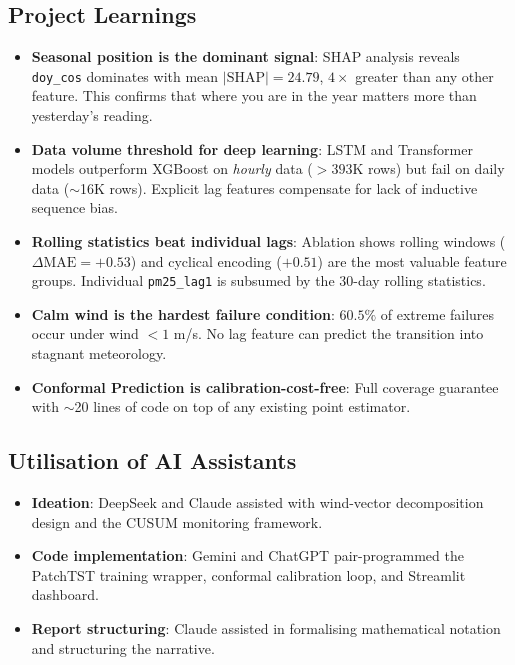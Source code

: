 \documentclass[11pt,a4paper]{article}
\begin{document}
\subsection{Project Learnings}
\begin{itemize}
    \item \textbf{Seasonal position is the dominant signal}: SHAP analysis reveals \texttt{doy\_cos} dominates with mean $|\text{SHAP}|=24.79$, $4\times$ greater than any other feature. This confirms that where you are in the year matters more than yesterday's reading.
    \item \textbf{Data volume threshold for deep learning}: LSTM and Transformer models outperform XGBoost on \emph{hourly} data ($>393$K rows) but fail on daily data ($\sim$16K rows). Explicit lag features compensate for lack of inductive sequence bias.
    \item \textbf{Rolling statistics beat individual lags}: Ablation shows rolling windows ($\Delta\mathrm{MAE}=+0.53$) and cyclical encoding ($+0.51$) are the most valuable feature groups. Individual \texttt{pm25\_lag1} is subsumed by the 30-day rolling statistics.
    \item \textbf{Calm wind is the hardest failure condition}: $60.5\%$ of extreme failures occur under wind $<1$ m/s. No lag feature can predict the transition into stagnant meteorology.
    \item \textbf{Conformal Prediction is calibration-cost-free}: Full coverage guarantee with $\sim$20 lines of code on top of any existing point estimator.
\end{itemize}

\subsection{Utilisation of AI Assistants}
\begin{itemize}
    \item \textbf{Ideation}: DeepSeek and Claude assisted with wind-vector decomposition design and the CUSUM monitoring framework.
    \item \textbf{Code implementation}: Gemini and ChatGPT pair-programmed the PatchTST training wrapper, conformal calibration loop, and Streamlit dashboard.
    \item \textbf{Report structuring}: Claude assisted in formalising mathematical notation and structuring the narrative.
\end{itemize}

\end{document}
